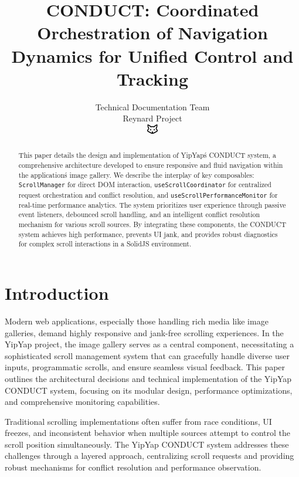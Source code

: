 \documentclass[10pt]{article}
\begin{document}
\title{CONDUCT: Coordinated Orchestration of Navigation Dynamics for Unified Control and Tracking}

\author{Technical Documentation Team\\
Reynard Project\\
\includegraphics[width=0.5cm]{favicon.pdf}}

\maketitle

\begin{abstract}
This paper details the design and implementation of YipYap\'s CONDUCT system, 
a comprehensive architecture developed to ensure responsive and fluid navigation 
within the application\'s image gallery. We describe the interplay of key composables: 
\texttt{ScrollManager} for direct DOM interaction, \texttt{useScrollCoordinator} 
for centralized request orchestration and conflict resolution, and 
\texttt{useScrollPerformanceMonitor} for real-time performance analytics. 
The system prioritizes user experience through passive event listeners, 
debounced scroll handling, and an intelligent conflict resolution mechanism 
for various scroll sources. By integrating these components, the CONDUCT system 
achieves high performance, prevents UI jank, and provides robust diagnostics 
for complex scroll interactions in a SolidJS environment.
\end{abstract}

\section{Introduction}

Modern web applications, especially those handling rich media like image galleries, demand highly responsive and jank-free scrolling experiences. In the YipYap project, the image gallery serves as a central component, necessitating a sophisticated scroll management system that can gracefully handle diverse user inputs, programmatic scrolls, and ensure seamless visual feedback. This paper outlines the architectural decisions and technical implementation of the YipYap CONDUCT system, focusing on its modular design, performance optimizations, and comprehensive monitoring capabilities.

Traditional scrolling implementations often suffer from race conditions, UI freezes, and inconsistent behavior when multiple sources attempt to control the scroll position simultaneously. The YipYap CONDUCT system addresses these challenges through a layered approach, centralizing scroll requests and providing robust mechanisms for conflict resolution and performance observation.
\end{document}
